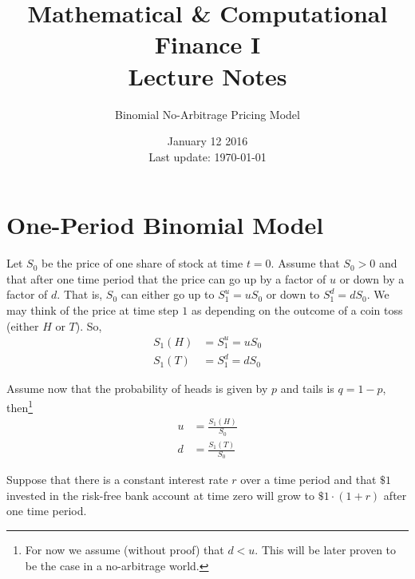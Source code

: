 \documentclass[12pt]{article}
\newlength\tindent
\renewcommand{\indent}{\hspace*{\tindent}}
\begin{document}
 
 
\title{Mathematical \& Computational Finance I\\Lecture Notes}
\author{Binomial No-Arbitrage Pricing Model}
\date{January 12 2016 \\ Last update: \today{}}
\maketitle

\section{One-Period Binomial Model}

\indent Let $S_0$ be the price of one share of stock at time $t = 0$. Assume that $S_0 > 0$ and that after one time period that the price can go up by a factor of $u$ or down by a factor of $d$. That is, $S_0$ can either go up to $S^u_1 = uS_0$ or down to $S^d_1 = dS_0$. We may think of the price at time step $1$ as depending on the outcome of a coin toss (either $H$ or $T$). So,
\begin{align*}
	S_1(H) &= S^u_1 = uS_0 \\
	S_1(T) &= S^d_1 = dS_0
\end{align*}

Assume now that the probability of heads is given by $p$ and tails is $q = 1 - p$, then\footnote{For now we assume (without proof) that $d < u$. This will be later proven to be the case in a no-arbitrage world.}
\begin{align*}
	u &= \frac{S_1(H)}{S_0} \\
	d &= \frac{S_1(T)}{S_0}
\end{align*}

\indent Suppose that there is a constant interest rate $r$ over a time period and that $\$1$ invested in the risk-free bank account at time zero will grow to $\$1\cdot(1 + r)$ after one time period.
\end{document}
